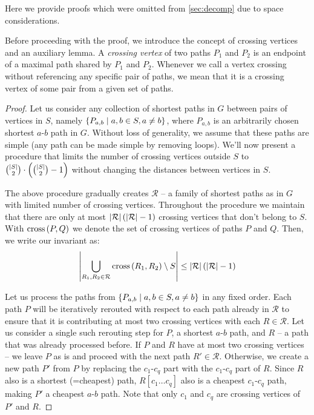     \label{apx:compression_lemma}

    Here we provide proofs which were omitted from \cref{sec:decomp} due to space considerations.

    \compressionlemma*

    Before proceeding with the proof, we introduce the concept of crossing vertices and an auxiliary lemma.
    A \emph{crossing vertex} of two paths $P_1$ and $P_2$ is an endpoint of a maximal path shared by $P_1$ and $P_2$.
    Whenever we call a vertex crossing without referencing any specific pair of paths,
    we mean that it is a crossing vertex of some pair from a given set of paths.
    
    \crossingvtexlemma*
    \begin{proof}
        \newcommand{\cross}[2]{\mathrm{cross}\bra{#1, #2}}
        Let us consider any collection of shortest paths in $G$ between pairs of vertices in $S$, namely
        $ \left\{ P_{a, b} \; \middle| \; a, b \in S, a \neq b \right\} $,
        where $P_{a, b}$ is an arbitrarily chosen shortest $a$-$b$ path in $G$.
        Without loss of generality, we assume that these paths are simple (any path can be made simple by removing loops).
        We'll now present a procedure that limits the number of crossing vertices outside $S$ to
        ${\left| S \right| \choose 2} \cdot \left( {\left| S \right| \choose 2} - 1 \right)$
        without changing the distances between vertices in $S$.

        
    
        The above procedure gradually creates $\mathcal{R}$ -- a family of shortest paths as in
        $G$ with limited number of crossing vertices.
        Throughout the procedure we maintain that there are only at most
        $\left| \mathcal{R} \right| \left(  \left| \mathcal{R} \right| - 1 \right)$ crossing vertices that don't belong to $S$.
        With $\cross{P}{Q}$ we denote the set of crossing vertices of paths $P$ and $Q$.
        Then, we write our invariant as:
        \begin{equation}
            \label{crossing_invariant}
            \abs{ \bigcup_{R_1, R_2 \in \mathcal{R}} \cross{R_1}{R_2} \setminus S } \leq \abs{\mathcal{R}} \bra{ \abs{\mathcal{R}} - 1}
        \end{equation}

    Let us process the paths from $ \left\{ P_{a, b} \; \middle| \; a, b \in S, a \neq b \right\} $ in any fixed order.
    Each path $P$ will be iteratively rerouted with respect to each path already in $\mathcal{R}$
    to ensure that it is contributing at most two crossing vertices with each $R \in \mathcal{R}$.
    Let us consider a single such rerouting step for $P$, a shortest $a$-$b$ path, and $R$ -- a path that was already processed before.
    If $P$ and $R$ have at most two crossing vertices -- we leave $P$ as is and proceed with the next path $R' \in \mathcal{R}$.
    Otherwise, we create a new path $P'$ from $P$ by replacing the $c_1$-$c_q$ part with the $c_1$-$c_q$ part of $R$.
    Since $R$ also is a shortest (=cheapest) path, $R[c_1 \dots c_q]$ also is a cheapest $c_1$-$c_q$ path,
    making $P'$ a cheapest $a$-$b$ path.
    Note that only $c_1$ and $c_q$ are crossing vertices of $P'$ and $R$.


\end{proof}
